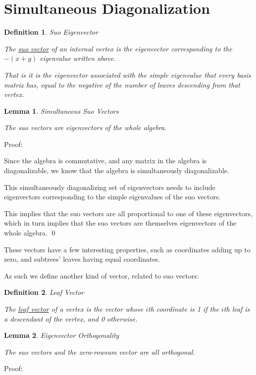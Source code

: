 \documentclass[10pt,a4paper]{report}
\newtheorem{definition}{Definition}
\newtheorem{lemma}{Lemma}
\begin{document}
\section{Simultaneous Diagonalization}

\begin{definition} Suo Eigenvector

	The \underline{suo vector} of an internal vertex is the eigenvector corresponding to
	the $-(x+y)$ eigenvalue written above.

	That is it is the eigenvector associated with the simple eigenvalue that
	every basis matrix has, equal to the negative of the number of leaves
	descending from that vertex.
\end{definition}

\begin{lemma} Simultaneous Suo Vectors

	The suo vectors are eigenvectors of the whole algebra.
\end{lemma}
Proof:

Since the algebra is commutative, and any matrix in the algebra is
diagonalizable, we know that the algebra is simultaneously diagonalizable.

This simultaneously diagonalizing set of eigenvectors needs to include
eigenvectors corresponding to the simple eigenvalues of the suo vectors.

This implies that the suo vectors are all proportional to one of these
eigenvectors, which in turn implies that the suo vectors are themselves
eigenvectors of the whole algebra. \qed

These vectors have a few interesting properties, such as coordinates adding up
to zero, and subtrees' leaves having equal coordinates.

As such we define another kind of vector, related to suo vectors:

\begin{definition} Leaf Vector

	The \underline{leaf vector} of a vertex is the vector whose $i$th coordinate is 1 if the
	$i$th leaf is a descendant of the vertex, and 0 otherwise.
\end{definition}

\begin{lemma} Eigenvector Orthogonality

	The suo vectors and the zero-rowsum vector are all orthogonal.
\end{lemma}

Proof:
\end{document}
